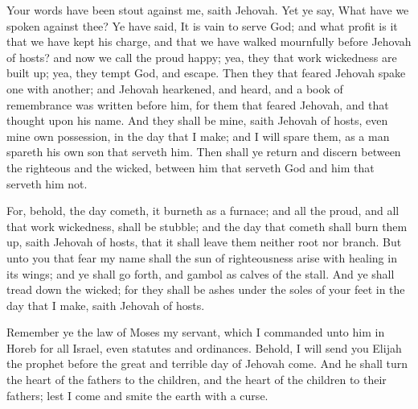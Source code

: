 Your words have been stout against me, saith Jehovah. Yet ye say, What have we spoken against thee? Ye have said, It is vain to serve God; and what profit is it that we have kept his charge, and that we have walked mournfully before Jehovah of hosts? and now we call the proud happy; yea, they that work wickedness are built up; yea, they tempt God, and escape.  Then they that feared Jehovah spake one with another; and Jehovah hearkened, and heard, and a book of remembrance was written before him, for them that feared Jehovah, and that thought upon his name. And they shall be mine, saith Jehovah of hosts, even mine own possession, in the day that I make; and I will spare them, as a man spareth his own son that serveth him. Then shall ye return and discern between the righteous and the wicked, between him that serveth God and him that serveth him not. 

For, behold, the day cometh, it burneth as a furnace; and all the proud, and all that work wickedness, shall be stubble; and the day that cometh shall burn them up, saith Jehovah of hosts, that it shall leave them neither root nor branch. But unto you that fear my name shall the sun of righteousness arise with healing in its wings; and ye shall go forth, and gambol as calves of the stall. And ye shall tread down the wicked; for they shall be ashes under the soles of your feet in the day that I make, saith Jehovah of hosts.  

Remember ye the law of Moses my servant, which I commanded unto him in Horeb for all Israel, even statutes and ordinances. Behold, I will send you Elijah the prophet before the great and terrible day of Jehovah come. And he shall turn the heart of the fathers to the children, and the heart of the children to their fathers; lest I come and smite the earth with a curse. 